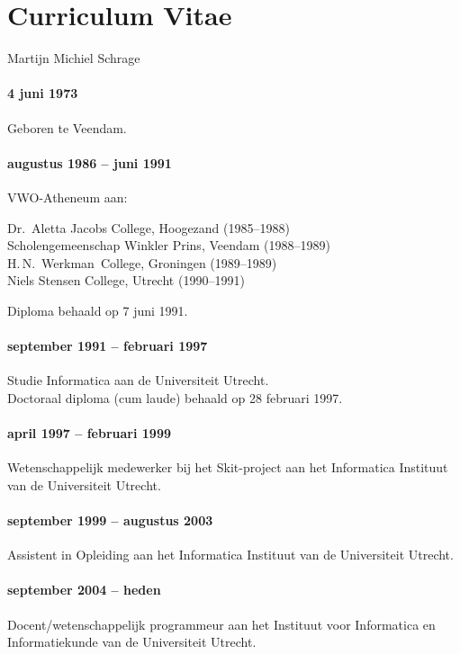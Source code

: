 \chapter*{Curriculum Vitae}
\label{chap:cv}

Martijn Michiel Schrage

\subsubsection*{4 juni 1973}
Geboren te Veendam.

\subsubsection*{augustus 1986 -- juni 1991}

VWO-Atheneum aan:

Dr.~Aletta Jacobs College, Hoogezand (1985--1988)\\
Scholengemeenschap Winkler Prins, Veendam (1988--1989)\\
H.\,N.~Werkman~College, Groningen (1989--1989)\\
Niels Stensen College, Utrecht (1990--1991)

Diploma behaald op 7 juni 1991.

\subsubsection*{september 1991 -- februari 1997}
Studie Informatica aan de Universiteit Utrecht.\\
Doctoraal diploma (cum laude) behaald op 28 februari 1997.

\subsubsection*{april 1997 -- februari 1999}
Wetenschappelijk medewerker bij het Skit-project aan het Informatica Instituut van de
Universiteit Utrecht.

\subsubsection*{september 1999 -- augustus 2003}
Assistent in Opleiding aan het Informatica Instituut van de
Universiteit Utrecht.

\subsubsection*{september 2004 -- heden}
Docent/wetenschappelijk programmeur aan het Instituut voor Informatica en Informatiekunde van de Universiteit Utrecht.